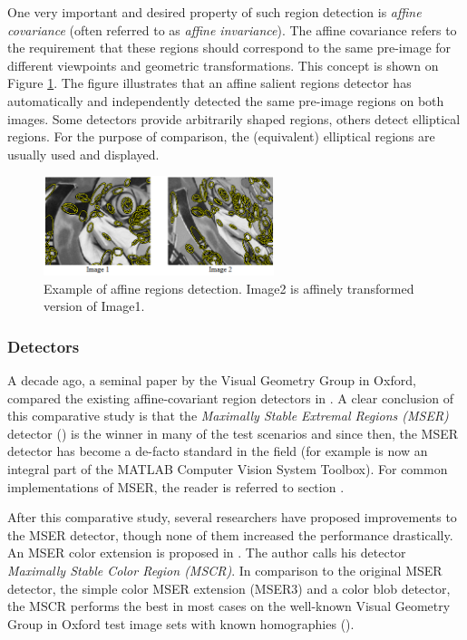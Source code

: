 One very important and desired property of such region detection is {\em affine covariance} (often referred to as {\em affine invariance}).  The affine covariance refers to the requirement that these regions should correspond to the same pre-image for different viewpoints and geometric transformations. This concept is shown on Figure \ref{fig:affreg}. The figure illustrates that an affine salient regions detector has automatically and independently detected the same pre-image regions on both images. Some detectors provide arbitrarily shaped regions, others detect elliptical regions. For the purpose of comparison, the (equivalent) elliptical regions are usually used and displayed.
\begin{figure}[H]
\begin{center}
\includegraphics[width=0.6\textwidth]{fig/AffineRegions}
\end{center}
\caption{Example of affine regions detection. Image2 is affinely transformed version of Image1.}
\label{fig:affreg}
\end{figure}

\subsubsection{Detectors}
A decade ago, a seminal paper by the Visual Geometry Group in Oxford, compared the existing affine-covariant region detectors in \cite{Mikolajczyk:2005}. A clear conclusion of this comparative study is that the  {\em  Maximally Stable Extremal Regions (MSER)} detector (\cite{Matas2002BMVC}) is the winner in many of the test scenarios and since then, the MSER detector has become a de-facto standard in the field (for example is now an integral part of the MATLAB Computer Vision System Toolbox). For common implementations of MSER, the reader is referred to section .

After this comparative study, several researchers have proposed improvements to the MSER detector, though none of them increased the performance drastically. 
An MSER color extension is proposed in \cite{Forssen07}. The author calls his detector {\em Maximally Stable Color Region (MSCR)}. In comparison to the original MSER detector, the simple color MSER extension (MSER3) and a color blob detector, the MSCR performs the best in most cases on the well-known Visual Geometry Group in Oxford test image sets with known homographies (\cite{vgg_soft_data}). 

